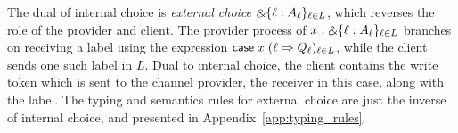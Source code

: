 The dual of internal choice is \emph{external choice} $\mathbin{\binampersand} \{ \ell :
A_\ell \}_{\ell \in L}$, which reverses the role of the provider and client.
The provider process of $x : \mathbin{\binampersand} \{ \ell : A_\ell \}_{\ell \in L}$ branches on receiving a label
using the expression $\mathsf{case} \; x \; (\ell \Rightarrow Q_\ell)_{\ell \in L}$,
while the client sends one such label in $L$.
Dual to internal choice, the client \Fcom contains the write token which is
sent to the channel provider, the receiver in this case, along with the label.
The typing and semantics rules for external choice are just the inverse of internal choice,
and presented in Appendix~\ref{app:typing_rules}.


